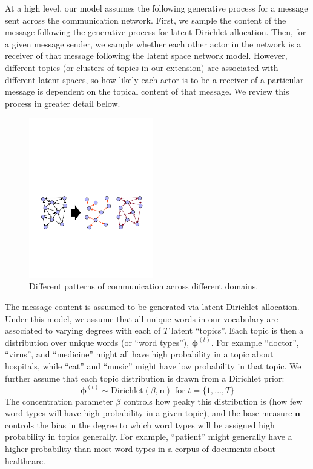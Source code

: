 \documentclass{pnastwo}
\begin{document}
\begin{article}
At a high level, our model assumes the following generative process for a message sent across the communication network. First, we sample the content of the message following the generative process for latent Dirichlet allocation. Then, for a given message sender, we sample whether each other actor in the network is a receiver of that message following the latent space network model. However, different topics (or clusters of topics in our extension) are associated with different latent spaces, so how likely each actor is to be a receiver of a particular message is dependent on the topical content of that message. We review this process in greater detail below.  

 \begin{figure}
\caption{\label{fig:splitting} Different patterns of communication across different domains.}	
\centering
\includegraphics[width = 0.48\textwidth]{images/Structure_Matters_Full.pdf}
\end{figure}

The message content is assumed to be generated via latent Dirichlet allocation. Under this model, we assume that all unique words in our vocabulary are associated to varying degrees with each of $T$ latent ``topics''. Each topic is then a distribution over unique words (or ``word types''), $\boldsymbol{\phi}^{(t)}$. For example ``doctor'', ``virus'', and ``medicine'' might all have high probability in a topic about hospitals, while ``cat'' and ``music'' might have low probability in that topic. We further assume that each topic distribution is drawn from a Dirichlet prior: 
\begin{equation}
	\boldsymbol{\phi}^{(t)} \sim \text{Dirichlet}(\beta,\boldsymbol{n}) \text{ for } t = \{1, ..., T\}
\end{equation}
The concentration parameter $\beta$ controls how peaky this distribution is (how few word types will have high probability in a given topic), and the base measure $\boldsymbol{n}$ controls the bias in the degree to which word types will be assigned high probability in topics generally. For example, ``patient'' might generally have a higher probability than most word types in a corpus of documents about healthcare.   


\end{article}
\end{document}

